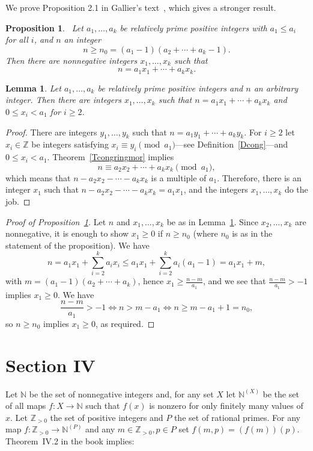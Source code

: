 \documentclass[12pt,letterpaper]{article}
\newcommand{\N}{\mathbb{N}}
\newcommand{\Z}{\mathbb{Z}}
\newtheorem{lem}[thm]{Lemma} %
\newtheorem{prop}[thm]{Proposition}
\theoremstyle{definition}
\begin{document}
We prove Proposition 2.1 in Gallier's text~\cite{gallier_frobenius}, which gives a stronger result. 

\begin{prop}~\label{PG}
Let $a_1,\ldots,a_k$ be relatively prime positive integers with $a_1\le a_i$ for all $i$, and $n$ an integer 
$$
n \ge n_0=(a_1-1)(a_2+\cdots+a_k-1).
$$ 
Then there are nonnegative integers $x_1,\ldots,x_k$ such that 
$$
n=a_1x_1+\cdots+a_kx_k.
$$ 
\end{prop} 

\begin{lem}\label{L5}
Let $a_1,\ldots,a_k$ be relatively prime positive integers and $n$ an arbitrary integer. Then there are integers $x_1,\ldots,x_k$ such that $n=a_1x_1+\cdots+a_kx_k$ and $0\le x_i<a_1$ for $i\ge2$. 
\end{lem} 

\begin{proof}
There are integers $y_1,\ldots,y_k$ such that $n=a_1y_1+\cdots+a_ky_k$. For $i\ge2$ let $x_i\in\Z$ be integers satisfying $x_i \equiv y_i \pmod{a_1}$---see Definition~\ref{Dcong}---and $0\le x_i<a_1$. Theorem~\ref{Tcongringmor} implies 
$$
n \equiv a_2x_2+\cdots+a_kx_k \pmod{a_1},
$$ 
which means that $n - a_2x_2 - \cdots - a_kx_k$ is a multiple of $a_1$. Therefore, there is an integer $x_1$ such that $n - a_2x_2 - \cdots - a_kx_k = a_1x_1$, and the integers $x_1,\ldots,x_k$ do the job.
\end{proof} 

\begin{proof}[Proof of Proposition~\ref{PG}]
Let $n$ and $x_1,\ldots,x_k$ be as in Lemma~\ref{L5}. Since $x_2,\ldots,x_k$ are nonnegative, it is enough to show $x_1\ge0$ if $n\ge n_0$ (where $n_0$ is as in the statement of the proposition). We have 
\[
n = a_1x_1 + \sum_{i=2}^k a_ix_i \le a_1x_1 + \sum_{i=2}^k a_i(a_1-1) = a_1x_1 + m,
\]
with $m=(a_1-1)(a_2+\cdots+a_k)$, hence $x_1\ge\frac{n-m}{a_1}$, and we see that $\frac{n-m}{a_1}>-1$ implies $x_1\ge0$. We have
\[
\frac{n-m}{a_1}>-1\Leftrightarrow n>m-a_1\Leftrightarrow n\ge m-a_1+1=n_0,
\]
so $n\ge n_0$ implies $x_1\ge0$, as required.
\end{proof} 

\section{Section IV} 

Let $\N$ be the set of nonnegative integers and, for any set $X$ let $\N^{(X)}$ be the set of all maps $f:X\to\N$ such that $f(x)$ is nonzero for only finitely many values of $x$. Let $\Z_{>0}$ the set of positive integers and $P$ the set of rational primes. For any map $f:\Z_{>0}\to\N^{(P)}$ and any $m\in\Z_{>0}, p\in P$ set $f(m,p)=(f(m))(p)$. Theorem~IV.2 in the book implies: 
\end{document}
